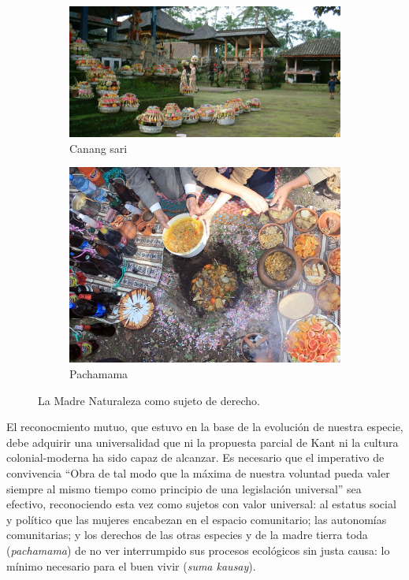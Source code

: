 \documentclass[a4paper,10pt]{book}
\begin{document}
\begin{figure}[ht!]
    \centering
    \begin{subfigure}[b]{0.45\textwidth}
    \centering
    \includegraphics[width=\linewidth]{static/bali-offerings}
    \caption{Canang sari}
    \label{}
    \end{subfigure}
    \begin{subfigure}[b]{0.33\textwidth}
    \centering
    \includegraphics[width=\linewidth]{static/pachamama}
    \caption{Pachamama}
    \label{}
    \end{subfigure}
    \caption{La Madre Naturaleza como sujeto de derecho.}
    \label{fig:mito}
\end{figure}

El reconocmiento mutuo, que estuvo en la base de la evolución de nuestra especie, debe adquirir una universalidad que ni la propuesta parcial de Kant ni la cultura colonial-moderna ha sido capaz de alcanzar.
Es necesario que el imperativo de convivencia ``Obra de tal modo que la máxima de nuestra voluntad pueda valer siempre al mismo tiempo como principio de una legislación universal'' sea efectivo, reconociendo esta vez como sujetos con valor universal: al estatus social y político que las mujeres encabezan en el espacio comunitario; las autonomías comunitarias; y los derechos de las otras especies y de la madre tierra toda (\emph{pachamama}) de no ver interrumpido sus procesos ecológicos sin justa causa: lo mínimo necesario para el buen vivir (\emph{suma kausay}).
\end{document}
